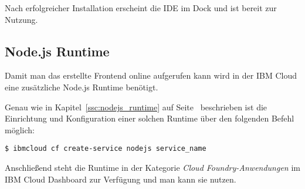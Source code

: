 Nach erfolgreicher Installation erscheint die IDE im Dock und ist bereit zur Nutzung.

\subsection{Node.js Runtime}
Damit man das erstellte Frontend online aufgerufen kann wird in der IBM Cloud eine zusätzliche Node.js Runtime
benötigt.

Genau wie in Kapitel~\ref{ssc:nodejs_runtime} auf Seite~\pageref{ssc:nodejs_runtime} beschrieben ist die Einrichtung
und Konfiguration einer solchen Runtime über den folgenden Befehl möglich:

\begin{lstlisting}[caption=Instanziierung der Node.js Runtime, label=ls:vorbereitung_nodejsdashboard]
    $ ibmcloud cf create-service nodejs service_name
\end{lstlisting}

Anschließend steht die Runtime in der Kategorie \textit{Cloud Foundry-Anwendungen} im IBM Cloud Dashboard zur Verfügung
und man kann sie nutzen.